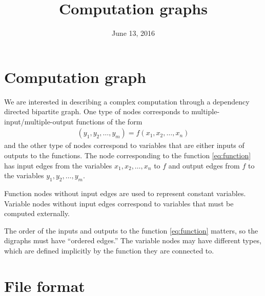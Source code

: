 \documentclass[11pt]{article}
\title{Computation graphs}
\author{\jph}
\date{June 13, 2016}
\begin{document}
                        \maketitle


\section{Computation graph}

We are interested in describing a complex computation through a
dependency directed bipartite graph. One type of nodes corresponds to
multiple-input/multiple-output functions of the form
\begin{align}\label{eq:function}
  (y_1,y_2,\dots,y_m)=f(x_1,x_2,\dots,x_n)
\end{align}
and the other type of nodes correspond to variables that are either
inputs of outputs to the functions. The node corresponding to the
function \eqref{eq:function} has input edges from the variables
$x_1,x_2,\dots,x_n$ to $f$ and output edges from $f$ to the variables
$y_1,y_2,\dots,y_m$. 

\medskip

Function nodes without input edges are used to represent constant
variables. Variable nodes without input edges correspond to variables
that must be computed externally.

\medskip

The order of the inputs and outputs to the function
\eqref{eq:function} matters, so the digraphs must have ``ordered
edges.'' The variable nodes may have different types, which are
defined implicitly by the function they are connected to.

\section{File format}
\end{document}

